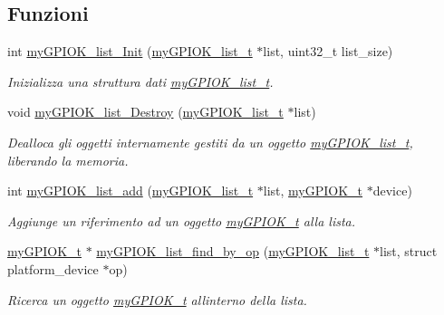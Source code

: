 \subsection*{Funzioni}
\begin{DoxyCompactItemize}
\item 
int \hyperlink{group___device_list_ga1051095fc78c8ba7cf0b20a20fa253d2}{my\+G\+P\+I\+O\+K\+\_\+list\+\_\+\+Init} (\hyperlink{structmy_g_p_i_o_k__list__t}{my\+G\+P\+I\+O\+K\+\_\+list\+\_\+t} $\ast$list, uint32\+\_\+t list\+\_\+size)
\begin{DoxyCompactList}\small\item\em Inizializza una struttura dati \hyperlink{structmy_g_p_i_o_k__list__t}{my\+G\+P\+I\+O\+K\+\_\+list\+\_\+t}. \end{DoxyCompactList}\item 
void \hyperlink{group___device_list_ga416dfff8f4bf6034c87d60968056c621}{my\+G\+P\+I\+O\+K\+\_\+list\+\_\+\+Destroy} (\hyperlink{structmy_g_p_i_o_k__list__t}{my\+G\+P\+I\+O\+K\+\_\+list\+\_\+t} $\ast$list)
\begin{DoxyCompactList}\small\item\em Dealloca gli oggetti internamente gestiti da un oggetto \hyperlink{structmy_g_p_i_o_k__list__t}{my\+G\+P\+I\+O\+K\+\_\+list\+\_\+t}, liberando la memoria. \end{DoxyCompactList}\item 
int \hyperlink{group___device_list_gac5048cf2dbbbce3c39485e15595e88c9}{my\+G\+P\+I\+O\+K\+\_\+list\+\_\+add} (\hyperlink{structmy_g_p_i_o_k__list__t}{my\+G\+P\+I\+O\+K\+\_\+list\+\_\+t} $\ast$list, \hyperlink{structmy_g_p_i_o_k__t}{my\+G\+P\+I\+O\+K\+\_\+t} $\ast$device)
\begin{DoxyCompactList}\small\item\em Aggiunge un riferimento ad un oggetto \hyperlink{structmy_g_p_i_o_k__t}{my\+G\+P\+I\+O\+K\+\_\+t} alla lista. \end{DoxyCompactList}\item 
\hyperlink{structmy_g_p_i_o_k__t}{my\+G\+P\+I\+O\+K\+\_\+t} $\ast$ \hyperlink{group___device_list_ga616aa45c32b2ff391fc2b89930d1141b}{my\+G\+P\+I\+O\+K\+\_\+list\+\_\+find\+\_\+by\+\_\+op} (\hyperlink{structmy_g_p_i_o_k__list__t}{my\+G\+P\+I\+O\+K\+\_\+list\+\_\+t} $\ast$list, struct platform\+\_\+device $\ast$op)
\begin{DoxyCompactList}\small\item\em Ricerca un oggetto \hyperlink{structmy_g_p_i_o_k__t}{my\+G\+P\+I\+O\+K\+\_\+t} all\textquotesingle{}interno della lista. \end{DoxyCompactList}\item 

\end{DoxyCompactItemize}
